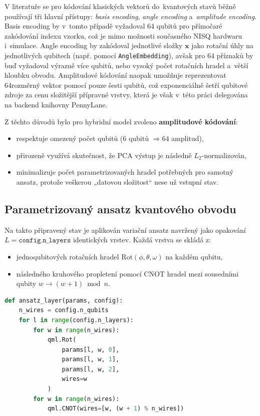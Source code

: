 \documentclass[12pt, a4paper]{report}
\begin{document}
V literatuře se pro kódování klasických vektorů do~kvantových stavů běžně používají tři hlavní přístupy: \textit{basis encoding}, \textit{angle encoding} a~\textit{amplitude encoding}. Basis encoding by v~tomto případě vyžadoval 64 qubitů pro přímočaré zakódování indexu vzorku, což je mimo možnosti současného NISQ hardwaru i~simulace. Angle encoding by zakódoval jednotlivé složky \(\mathbf{x}\) jako rotační úhly na jednotlivých qubitech (např. pomocí \texttt{AngleEmbedding}), avšak pro 64 příznaků by buď vyžadoval výrazně více qubitů, nebo vysoký počet rotačních hradel a~větší hloubku obvodu. Amplitudové kódování naopak umožňuje reprezentovat 64rozměrný vektor pomocí pouze šesti qubitů, což exponenciálně šetří qubitové zdroje za cenu složitější přípravné vrstvy, která je však v~této práci delegována na backend knihovny PennyLane.

Z těchto důvodů bylo pro hybridní model zvoleno \textbf{amplitudové kódování}: 
\begin{itemize}
    \item respektuje omezený počet qubitů (6 qubitů \(\Rightarrow 64\) amplitud),
    \item přirozeně využívá skutečnost, že PCA výstup je následně \(L_2\)-normalizován,
    \item minimalizuje počet parametrizovaných hradel potřebných pro samotný ansatz, protože veškerou „datovou složitost“ nese už vstupní stav.
\end{itemize}

\subsection{Parametrizovaný ansatz kvantového obvodu}

Na takto připravený stav je aplikován variační ansatz navržený jako opakování \(L = \texttt{config.n\_layers}\) identických vrstev. Každá vrstva se skládá z:
\begin{itemize}
    \item jednoqubitových rotačních hradel \(\mathrm{Rot}(\phi,\theta,\omega)\) na každém qubitu, 
    \item následného kruhového propletení pomocí CNOT hradel mezi sousedními qubity \(w \rightarrow (w+1) \bmod n\).
\end{itemize}

\vspace{1cm}

\begin{lstlisting}[language=Python, caption={Použitý ansatz s~rotačními hradly a~kruhovým propletením.}]
def ansatz_layer(params, config):
    n_wires = config.n_qubits
    for l in range(config.n_layers):
        for w in range(n_wires):
            qml.Rot(
                params[l, w, 0],
                params[l, w, 1],
                params[l, w, 2],
                wires=w
            )
        for w in range(n_wires):
            qml.CNOT(wires=[w, (w + 1) % n_wires])
\end{lstlisting}
\end{document}
